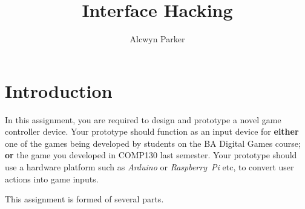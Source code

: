 \documentclass{../fal_assignment}
\title{Interface Hacking}
\author{Alcwyn Parker}
\begin{document}
\maketitle
%    
\section*{Introduction}

In this assignment, you are required to design and prototype a novel game controller device.
Your prototype should function as an input device for \textbf{either}
one of the games being developed by students on the BA Digital Games course; \textbf{or}
the game you developed in COMP130 last semester.
Your prototype should use a hardware platform such as \emph{Arduino} or \emph{Raspberry~Pi} etc,
to convert user actions into game inputs.


This assignment is formed of several parts.
\end{document}
